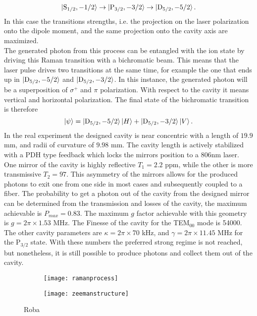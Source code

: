 \begin{equation}
\ket{\text{S}_{1/2},-1/2}\to\ket{\text{P}_{3/2},-3/2} \to \ket{\text{D}_{5/2},-5/2}.
\end{equation}
In this case the transitions strengths, i.e. the projection on the laser polarization onto the dipole moment, and the same projection onto the cavity axis are maximized.\\
The generated photon from this process can be entangled with the ion state by driving this Raman transition with a bichromatic beam. This means that the laser pulse drives two transitions at the same time, for example the one that ends up in $\ket{\text{D}_{5/2},-5/2}$ and $\ket{\text{D}_{5/2},-3/2}$. In this instance, the generated photon will be a superposition of $\sigma^+$ and $\pi$ polarization. With respect to the cavity it means vertical and horizontal polarization. The final state of the bichromatic transition is therefore
\begin{equation}
\ket{\psi} = \ket{\text{D}_{5/2},-5/2}\ket{H} + \ket{\text{D}_{5/2},-3/2}\ket{V}.
\end{equation}
In the real experiment the designed cavity is near concentric with a length of $19.9$ mm, and radii of curvature of $9.98$ mm. The cavity length is actively stabilized with a PDH type feedback which locks the mirrors position to a 806nm laser. One mirror of the cavity is highly reflective $T_1 = 2.2$ ppm, while the other is more transmissive $T_2 = 97$. This asymmetry of the mirrors allows for the produced photons to exit one from one side in most cases and subsequently coupled to a fiber. The probability to get a photon out of the cavity from the designed mirror can be determined from the transmission and losses of the cavity, the maximum achievable is $P_{max} = 0.83$. The maximum $g$ factor achievable with this geometry is $g = 2\pi \times 1.53$ MHz. The Finesse of the cavity for the TEM$_{00}$ mode is 54000. The other cavity parameters are $\kappa = 2\pi \times 70$ kHz, and $\gamma = 2\pi\times 11.45$ MHz for the $\text{P}_{3/2}$ state. With these numbers the preferred strong regime is not reached, but nonetheless,  it is still possible to produce photons and collect them out of the cavity.

\begin{figure}[H]
     \centering
     \begin{subfigure}[b]{0.49\textwidth}
         \centering
         \texttt{[image: ramanprocess]}
     \end{subfigure}
     \hfill
     \begin{subfigure}[b]{0.49\textwidth}
         \centering
         \texttt{[image: zeemanstructure]}
     \end{subfigure}
        \caption{Roba}
        \label{ramanprocess}
\end{figure}

